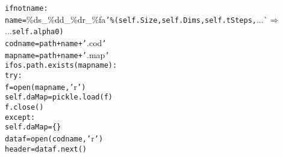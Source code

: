 {{\begin{tabbing}
{\texttt{\hspace{48pt}if\hspace{6pt}not\hspace{6pt}name:}}\\
{\texttt{\hspace{72pt}name\hspace{6pt}=\hspace{6pt}{'}}}\%ds\_\%dd\_\%dr\_\%fa{\texttt{{'}\%(self.Size,self.Dims,self.tSteps,}}{}...\`$\Rightarrow$\\
...{}{\texttt{self.alpha0)}}\\
{\texttt{\hspace{48pt}codname\hspace{6pt}=\hspace{6pt}path+name+{'}}}.cod{\texttt{{'}}}\\
{\texttt{\hspace{48pt}mapname\hspace{6pt}=\hspace{6pt}path+name+{'}}}.map{\texttt{{'}}}\\
{\texttt{\hspace{48pt}if\hspace{6pt}os.path.exists(mapname):}}\\
{\texttt{\hspace{72pt}try:}}\\
{\texttt{\hspace{96pt}f\hspace{6pt}=\hspace{6pt}open(mapname,{'}}}r{\texttt{{'})}}\\
{\texttt{\hspace{96pt}self.daMap\hspace{6pt}=\hspace{6pt}pickle.load(f)}}\\
{\texttt{\hspace{96pt}f.close()}}\\
{\texttt{\hspace{72pt}except:}}\\
{\texttt{\hspace{96pt}self.daMap\hspace{6pt}=\hspace{6pt}\{\}}}\\
{\texttt{\hspace{48pt}dataf\hspace{6pt}=\hspace{6pt}open(codname,{'}}}r{\texttt{{'})}}\\
{\texttt{\hspace{48pt}header\hspace{6pt}=\hspace{6pt}dataf.next()}}\\

\end{tabbing}}}
